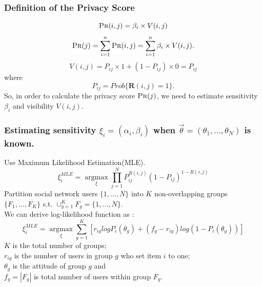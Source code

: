 \documentclass{beamer}
\begin{document}
\begin{frame}[fragile]
  \frametitle{Definition of the Privacy Score}
  \[\textsc{Pr}(i,j)=\beta_i\times V(i,j)\]
  \[\textsc{Pr}(j)=\sum_{i=1}^{n}\textsc{Pr}(i,j)=\sum_{i=1}^n\beta_i\times V(i,j). \]
   \[V(i,j)=P_{ij}\times 1 + (1-P_{ij})\times 0 = P_{ij}\]
   where \[P_{ij} = Prob\{\textbf{R}(i,j)=1\}.\]
 So, in order to calculate the privacy score $\textsc{Pr}(j)$, we need
 to estimate sensitivity $\beta_i$ and visibility $V(i,j)$.
\end{frame}

\begin{frame}
  \frametitle{\large{Estimating sensitivity $\xi_i=(\alpha_i,\beta_i)$ when
      $\overrightarrow{\theta}=(\theta_1,\dots,\theta_N)$ is known.}}
  \begin{block}
      {Use Maximum Likelihood Estimation(MLE).}
      \[\xi_i^{MLE}=\underset{\xi}{\operatorname{\arg\max}}
      {\prod_{j=1}^NP_{ij}^{R(i,j)}(1-P_{ij})^{1-R(i,j)}}\]
      Partition social network users $\{1,\dots,N\}$ into $K$
      non-overlapping groups $\{F_1,\ldots,F_K\}$ s.t. $\cup_{g=1}^KF_g=\{1,\ldots,N\}$. \\ 
      We can derive log-likelihood function as : 
      \[\xi_i^{MLE}=\underset{\xi}{\operatorname{\arg\max}}
      {\sum_{g=1}^K[r_{ig}logP_i(\theta_g)+(f_g-r_{ig})log(1-P_i(\theta_g))]}\]
      $K$ is the total number of groups; \\
      $r_{ig}$ is the number of users in group $g$ who set item $i$ to one; \\
      $\theta_g$ is the attitude of group $g$ and \\
      $f_g=|F_g|$ is total number of users within group $F_g$.
  \end{block}
\end{frame}
\end{document}
